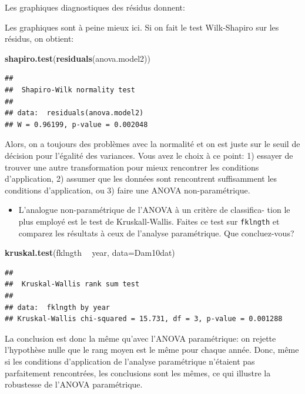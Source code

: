 \documentclass[12pt,]{book}
\newenvironment{Shaded}{\begin{snugshade}}{\end{snugshade}}
\newcommand{\DataTypeTok}[1]{\textcolor[rgb]{0.27,0.27,0.27}{#1}}
\newcommand{\KeywordTok}[1]{\textcolor[rgb]{0.27,0.27,0.27}{\textbf{#1}}}
\newcommand{\NormalTok}[1]{#1}
\newcommand{\OperatorTok}[1]{\textcolor[rgb]{0.43,0.43,0.43}{\textbf{#1}}}
\newcommand{\StringTok}[1]{\textcolor[rgb]{0.5,0.5,0.5}{#1}}
\providecommand{\tightlist}{%
  \setlength{\itemsep}{0pt}\setlength{\parskip}{0pt}}
\begin{document}
Les graphiques diagnostiques des résidus donnent:

Les graphiques sont à peine mieux ici. Si on fait le test Wilk-Shapiro sur les résidus, on obtient:

\begin{Shaded}
\begin{Highlighting}[]
\KeywordTok{shapiro.test}\NormalTok{(}\KeywordTok{residuals}\NormalTok{(anova.model2))}
\end{Highlighting}
\end{Shaded}

\begin{verbatim}
## 
## 	Shapiro-Wilk normality test
## 
## data:  residuals(anova.model2)
## W = 0.96199, p-value = 0.002048
\end{verbatim}

Alors, on a toujours des problèmes avec la normalité et on est juste sur le seuil de décision pour l'égalité des variances. Vous avez le choix à ce point: 1) essayer de trouver une autre transformation pour mieux rencontrer les conditions d'application, 2) assumer que les données sont rencontrent suffisamment les conditions d'application, ou 3) faire une ANOVA non-paramétrique.

\begin{itemize}
\tightlist
\item
  L'analogue non-paramétrique de l'ANOVA à un critère de classifica-
  tion le plus employé est le test de Kruskall-Wallis. Faites ce test sur \texttt{fklngth} et comparez les résultats à ceux de l'analyse paramétrique. Que concluez-vous?
\end{itemize}

\begin{Shaded}
\begin{Highlighting}[]
\KeywordTok{kruskal.test}\NormalTok{(fklngth }\OperatorTok{~}\StringTok{ }\NormalTok{year, }\DataTypeTok{data=}\NormalTok{Dam10dat)}
\end{Highlighting}
\end{Shaded}

\begin{verbatim}
## 
## 	Kruskal-Wallis rank sum test
## 
## data:  fklngth by year
## Kruskal-Wallis chi-squared = 15.731, df = 3, p-value = 0.001288
\end{verbatim}

La conclusion est donc la même qu'avec l'ANOVA paramétrique: on rejette l'hypothèse nulle que le rang moyen est le même pour chaque année. Donc, même si les conditions d'application de l'analyse paramétrique n'étaient pas parfaitement rencontrées, les conclusions sont les mêmes, ce qui illustre la robustesse de l'ANOVA paramétrique.
\end{document}

